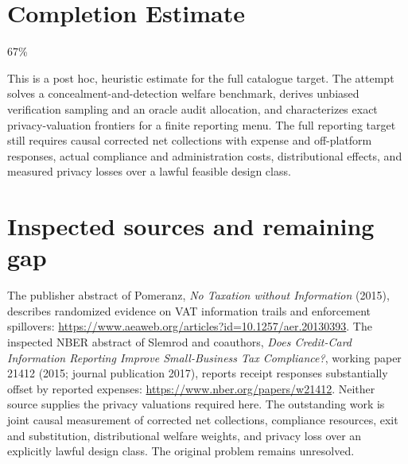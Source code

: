 \documentclass[11pt]{article}
\begin{document}
\section{Completion Estimate}
67\%

This is a post hoc, heuristic estimate for the full catalogue target.
The attempt solves a concealment-and-detection welfare benchmark, derives unbiased verification sampling and an oracle audit allocation, and characterizes exact privacy-valuation frontiers for a finite reporting menu. The full reporting target still requires causal corrected net collections with expense and off-platform responses, actual compliance and administration costs, distributional effects, and measured privacy losses over a lawful feasible design class.

\section*{Inspected sources and remaining gap}
The publisher abstract of Pomeranz, \emph{No Taxation without Information} (2015), describes randomized evidence on VAT information trails and enforcement spillovers:
\url{https://www.aeaweb.org/articles?id=10.1257/aer.20130393}.
The inspected NBER abstract of Slemrod and coauthors, \emph{Does Credit-Card Information Reporting Improve Small-Business Tax Compliance?}, working paper 21412 (2015; journal publication 2017), reports receipt responses substantially offset by reported expenses:
\url{https://www.nber.org/papers/w21412}.
Neither source supplies the privacy valuations required here. The outstanding work is joint causal measurement of corrected net collections, compliance resources, exit and substitution, distributional welfare weights, and privacy loss over an explicitly lawful design class. The original problem remains unresolved.
\end{document}
